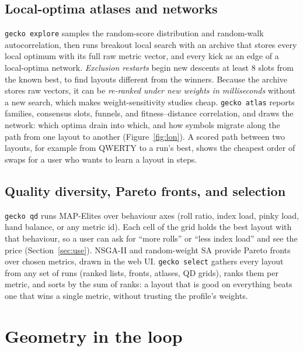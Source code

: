 \documentclass{gecko-paper}
\begin{document}
\begin{paperbody}
\subsection{Local-optima atlases and networks}
\texttt{gecko explore} samples the random-score distribution and random-walk autocorrelation, then runs breakout local search with an archive that stores every local optimum with its full raw metric vector, and every kick as an edge of a local-optima network. \emph{Exclusion restarts} begin new descents at least 8 slots from the known best, to find layouts different from the winners. Because the archive stores raw vectors, it can be \emph{re-ranked under new weights in milliseconds} without a new search, which makes weight-sensitivity studies cheap. \texttt{gecko atlas} reports families, consensus slots, funnels, and fitness–distance correlation, and draws the network: which optima drain into which, and how symbols migrate along the path from one layout to another (Figure~\ref{fig:lon}). A scored path between two layouts, for example from QWERTY to a run's best, shows the cheapest order of swaps for a user who wants to learn a layout in steps.


\subsection{Quality diversity, Pareto fronts, and selection}
\texttt{gecko qd} runs MAP-Elites over behaviour axes (roll ratio, index load, pinky load, hand balance, or any metric id). Each cell of the grid holds the best layout with that behaviour, so a user can ask for ``more rolls'' or ``less index load'' and see the price (Section~\ref{sec:use}). NSGA-II and random-weight SA provide Pareto fronts over chosen metrics, drawn in the web UI. \texttt{gecko select} gathers every layout from any set of runs (ranked lists, fronts, atlases, QD grids), ranks them per metric, and sorts by the sum of ranks: a layout that is good on everything beats one that wins a single metric, without trusting the profile's weights.

\section{Geometry in the loop}\label{sec:geom}

\end{paperbody}
\end{document}
